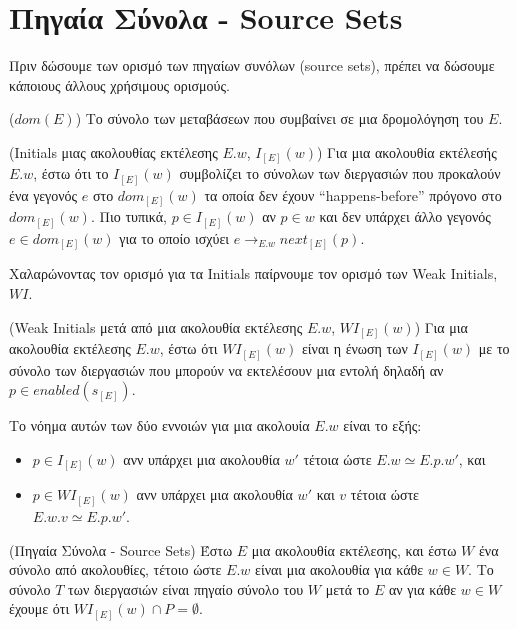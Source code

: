 
\section{Πηγαία Σύνολα - Source Sets}

Πριν δώσουμε των ορισμό των πηγαίων συνόλων (source sets), πρέπει να δώσουμε κάποιους άλλους χρήσιμους ορισμούς.

\begin{definition}{($dom(E)$)}
    Το σύνολο των μεταβάσεων που συμβαίνει σε μια δρομολόγηση του $E$.
\end{definition}

\begin{definition}{(Initials μιας ακολουθίας εκτέλεσης $E.w$, $I_{[E]}(w)$)}
Για μια ακολουθία εκτέλεσής $E.w$, έστω ότι το $I_{[E]}(w)$ συμβολίζει το σύνολων των διεργασιών που προκαλούν ένα γεγονός 
$e$ στο $dom_{[E]}(w)$ τα οποία δεν έχουν
“happens-before” πρόγονο στο $dom_{[E]}(w)$. Πιο τυπικά,
$p \in I_{[E]}(w)$ αν $p \in w$ και δεν υπάρχει άλλο γεγονός $e \in dom_{[E]}(w)$ για το οποίο ισχύει
$e \rightarrow_{E.w} next_{[E]}(p)$.
\end{definition}

Χαλαρώνοντας τον ορισμό για τα Initials παίρνουμε τον ορισμό των Weak Initials, $WI$.

\begin{definition}{(Weak Initials μετά από μια ακολουθία εκτέλεσης $E.w$, $WI_{[E]}(w)$)}
Για μια ακολουθία εκτέλεσης $E.w$, έστω ότι $WI_{[E]}(w)$ είναι η ένωση των $I_{[E]}(w)$ με το σύνολο των διεργασιών που μπορούν να εκτελέσουν μια εντολή δηλαδή
αν $p \in enabled(s_{[E]}) $.
\end{definition}

Το νόημα αυτών των δύο εννοιών για μια ακολουία $E.w$ είναι το εξής:
\begin{itemize}
    \item  $p \in I_{[E]}(w)$ ανν υπάρχει μια ακολουθία $w'$ τέτοια ώστε $E.w \simeq E.p.w'$, και
    \item  $p \in WI_{[E]}(w)$ ανν υπάρχει μια ακολουθία $w'$ και $v$ τέτοια ώστε $E.w.v \simeq E.p.w'$.
\end{itemize}

\begin{definition}{(Πηγαία Σύνολα - Source Sets)}
Έστω $E$ μια ακολουθία εκτέλεσης,
και έστω $W$ ένα σύνολο από ακολουθίες, τέτοιο ώστε $E.w$ είναι μια ακολουθία
για κάθε $w \in W$. Το σύνολο $T$ των διεργασιών είναι πηγαίο σύνολο του 
$W$ μετά το $E$ αν για κάθε $w \in W$ έχουμε ότι $WI_{[E]}(w) \cap P  = \emptyset$.
\end{definition}

